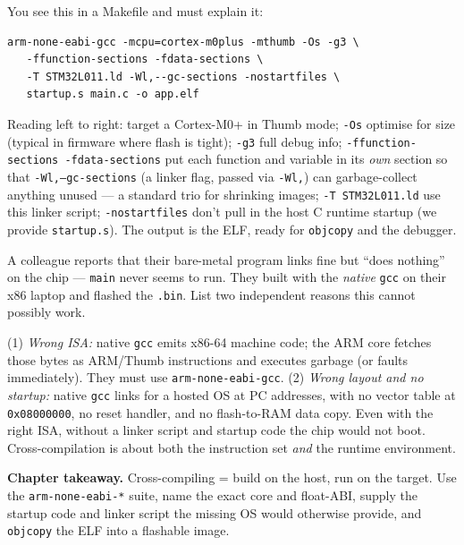 \documentclass[11pt,a4paper,oneside]{book}
\newcommand{\code}[1]{\texttt{#1}}
\begin{document}
\begin{wexample}
You see this in a Makefile and must explain it:
\begin{lstlisting}[style=shell]
arm-none-eabi-gcc -mcpu=cortex-m0plus -mthumb -Os -g3 \
   -ffunction-sections -fdata-sections \
   -T STM32L011.ld -Wl,--gc-sections -nostartfiles \
   startup.s main.c -o app.elf
\end{lstlisting}
Reading left to right: target a Cortex-M0+ in Thumb mode; \code{-Os} optimise
for size (typical in firmware where flash is tight); \code{-g3} full debug info;
\code{-ffunction-sections -fdata-sections} put each function and variable in its
\emph{own} section so that \code{-Wl,--gc-sections} (a linker flag, passed via
\code{-Wl,}) can garbage-collect anything unused --- a standard trio for
shrinking images; \code{-T STM32L011.ld} use this linker script;
\code{-nostartfiles} don't pull in the host C runtime startup (we provide
\code{startup.s}). The output is the ELF, ready for \code{objcopy} and the
debugger.
\end{wexample}

\begin{exercise}
A colleague reports that their bare-metal program links fine but ``does
nothing'' on the chip --- \code{main} never seems to run. They built with the
\emph{native} \code{gcc} on their x86 laptop and flashed the \code{.bin}. List
two independent reasons this cannot possibly work.
\end{exercise}
\begin{solution}
(1) \emph{Wrong ISA:} native \code{gcc} emits x86-64 machine code; the ARM core
fetches those bytes as ARM/Thumb instructions and executes garbage (or faults
immediately). They must use \code{arm-none-eabi-gcc}. (2) \emph{Wrong layout and
no startup:} native \code{gcc} links for a hosted OS at PC addresses, with no
vector table at \code{0x08000000}, no reset handler, and no
flash-to-RAM data copy. Even with the right ISA, without a linker script and
startup code the chip would not boot. Cross-compilation is about both the
instruction set \emph{and} the runtime environment.
\end{solution}

\begin{keyidea}
\textbf{Chapter takeaway.} Cross-compiling = build on the host, run on the
target. Use the \code{arm-none-eabi-*} suite, name the exact core and
float-ABI, supply the startup code and linker script the missing OS would
otherwise provide, and \code{objcopy} the ELF into a flashable image.
\end{keyidea}
\end{document}
